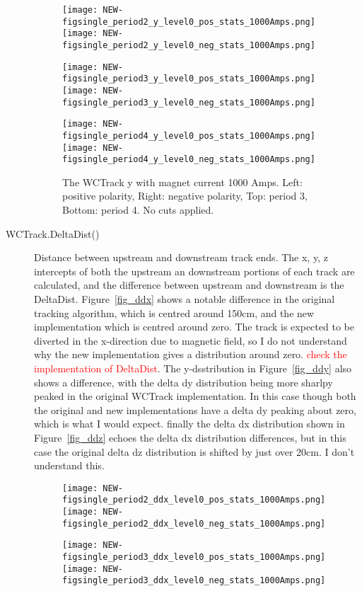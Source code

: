 \begin{description}
{      \begin{figure}[h]
        \centering   
         	\texttt{[image: NEW-figsingle\_period2\_y\_level0\_pos\_stats\_1000Amps.png]}
	 \texttt{[image: NEW-figsingle\_period2\_y\_level0\_neg\_stats\_1000Amps.png]}
	 
   	\texttt{[image: NEW-figsingle\_period3\_y\_level0\_pos\_stats\_1000Amps.png]}
	 \texttt{[image: NEW-figsingle\_period3\_y\_level0\_neg\_stats\_1000Amps.png]}
	 
 	\texttt{[image: NEW-figsingle\_period4\_y\_level0\_pos\_stats\_1000Amps.png]}
	 \texttt{[image: NEW-figsingle\_period4\_y\_level0\_neg\_stats\_1000Amps.png]}
   \caption[short]{The WCTrack y with magnet current 1000 Amps. Left: positive polarity, Right: negative polarity, Top: period 3, Bottom: period 4. No cuts applied.}
   \label{fig_y}
  \end{figure}
  
  
 }


\item[WCTrack.DeltaDist()]{
Distance between upstream and downstream track ends. The x, y, z intercepts of both the upstream an downstream portions of each track are calculated, and the difference between upstream and downstream is the DeltaDist. Figure~\ref{fig_ddx}  shows a notable difference in the original tracking algorithm, which is centred around 150cm,  and the new implementation which is centred around zero. The track is expected to be diverted in the x-direction due to magnetic field, so I do not understand why the new implementation gives a distribution around zero. \textcolor{red}{check the implementation of DeltaDist}. The y-dsstribution in Figure~\ref{fig_ddy} also shows a difference, with the delta dy distribution being more sharlpy peaked in the original WCTrack implementation.  In this case though both the original and new implementations have a delta dy peaking about zero, which is what I would expect. finally the delta dx distribution shown in Figure~\ref{fig_ddz} echoes the delta dx distribution differences, but in this case the original delta dz distribution is shifted by just over 20cm. I don't understand this. 

 \begin{figure}[h]	 
   \centering   
    	\texttt{[image: NEW-figsingle\_period2\_ddx\_level0\_pos\_stats\_1000Amps.png]}
	 \texttt{[image: NEW-figsingle\_period2\_ddx\_level0\_neg\_stats\_1000Amps.png]}
	 
   	\texttt{[image: NEW-figsingle\_period3\_ddx\_level0\_pos\_stats\_1000Amps.png]}
	 \texttt{[image: NEW-figsingle\_period3\_ddx\_level0\_neg\_stats\_1000Amps.png]}
	 

\end{figure}}
\end{description}
